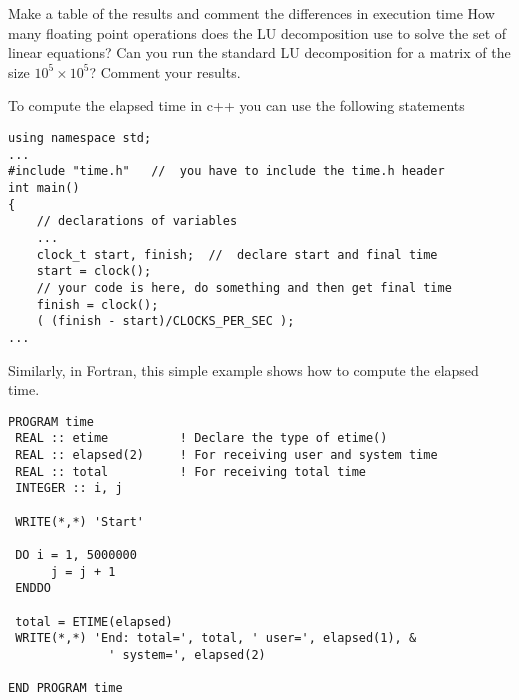 \begin{enumerate}
Make a table of the results and comment the differences
in execution time
How many floating point operations does the LU decomposition use to solve the set of linear equations?
Can you run the standard LU decomposition
for a matrix of the size $10^5\times 10^5$?
Comment your results.


To compute the elapsed time in c++ you can use the following statements
\begin{lstlisting}[title={Time in C++}]
using namespace std;
...
#include "time.h"   //  you have to include the time.h header
int main()
{
    // declarations of variables 
    ...
    clock_t start, finish;  //  declare start and final time
    start = clock();
    // your code is here, do something and then get final time
    finish = clock();
    ( (finish - start)/CLOCKS_PER_SEC );
...
\end{lstlisting}
Similarly, in Fortran, this simple example shows how to compute the elapsed time.
\lstset{language=[90]Fortran}
\begin{lstlisting}[title={Time in Fortran}]
PROGRAM time
 REAL :: etime          ! Declare the type of etime()
 REAL :: elapsed(2)     ! For receiving user and system time
 REAL :: total          ! For receiving total time
 INTEGER :: i, j

 WRITE(*,*) 'Start'

 DO i = 1, 5000000  
      j = j + 1
 ENDDO

 total = ETIME(elapsed)
 WRITE(*,*) 'End: total=', total, ' user=', elapsed(1), &
              ' system=', elapsed(2)

END PROGRAM time
\end{lstlisting}

\end{enumerate}
